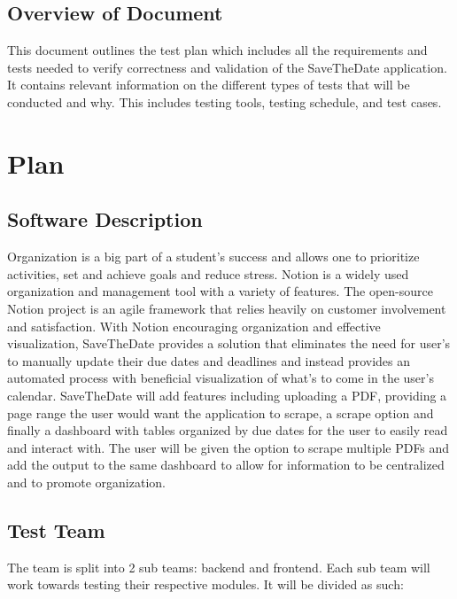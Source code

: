 \documentclass[12pt, titlepage]{article}
\begin{document}
\newpage

\subsection{Overview of Document}
This document outlines the test plan which includes all the requirements and tests needed to verify correctness and validation of the SaveTheDate application. It contains relevant information on the different types of tests that will be conducted and why. This includes testing tools, testing schedule, and test cases.  

\section{Plan}
	
\subsection{Software Description}

Organization is a big part of a student’s success and allows one to prioritize activities, set and achieve goals and reduce stress. Notion is a widely used organization and management tool with a variety of features. The open-source Notion project is an agile framework that relies heavily on customer involvement and satisfaction. With Notion encouraging organization and effective visualization, SaveTheDate provides a solution that eliminates the need for user’s to manually update their due dates and deadlines and instead provides an automated process with beneficial visualization of what’s to come in the user’s calendar. SaveTheDate will add features including uploading a PDF, providing a page range the user would want the application to scrape, a scrape option and finally a dashboard with tables organized by due dates for the user to easily read and interact with. The user will be given the option to scrape multiple PDFs and add the output to the same dashboard to allow for information to be centralized and to promote organization.  

\subsection{Test Team}

The team is split into 2 sub teams: backend and frontend. Each sub team will work towards testing their respective modules. It will be divided as such: \\
\end{document}
